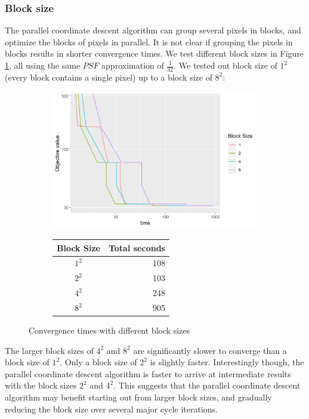 \subsubsection*{Block size}
The parallel coordinate descent algorithm can group several pixels in blocks, and optimize the blocks of pixels in parallel. It is not clear if grouping the pixels in blocks results in shorter convergence times. We test different block sizes in Figure \ref{pcdm:results:block}, all using the same $PSF$ approximation of $\frac{1}{32}$. We tested out block size of $1^2$ (every block contains a single pixel) up to a block size of $8^2$:

\begin{figure}[h]
	\centering
	\begin{subfigure}{0.6\linewidth}
		\includegraphics[width=1.0\linewidth]{./chapters/05.pcdm/parameters/blockSize.png}
	\end{subfigure}
	\begin{subfigure}{0.35\linewidth}
		\begin{tabular}{c | r}
			Block Size & Total seconds \\ \hline
			$1^2$ & 108 \\
			$2^2$ & 103 \\
			$4^2$ & 248 \\
			$8^2$ & 905 \\
		\end{tabular}
	\end{subfigure}
	\caption{Convergence times with different block sizes}
	\label{pcdm:results:block}
\end{figure}

The larger block sizes of $4^2$ and $8^2$ are significantly slower to converge than a block size of $1^2$. Only a block size of $2^2$ is slightly faster. Interestingly though, the parallel coordinate descent algorithm is faster to arrive at intermediate results with the block sizes $2^2$ and $4^2$. This suggests that the parallel coordinate descent algorithm may benefit starting out from larger block sizes, and gradually reducing the block size over several major cycle iterations.

